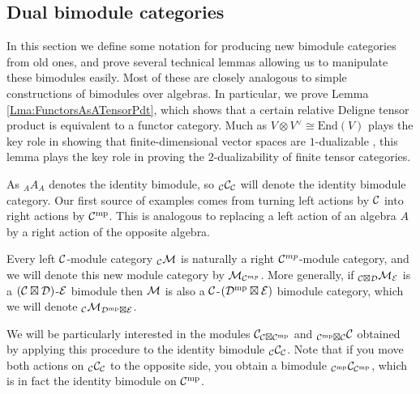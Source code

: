 \documentclass{amsart}
\begin{document}
\subsection{Dual bimodule categories} \label{sec:tc-bimodules} 

In this section we define some notation for producing new bimodule categories from old ones, and prove several technical lemmas allowing us to manipulate these bimodules easily.  Most of these are closely analogous to simple constructions of bimodules over algebras.  In particular, we prove Lemma \ref{Lma:FunctorsAsATensorPdt}, which shows that a certain relative Deligne tensor product is equivalent to a functor category.  Much as $V \otimes V^\vee \cong \mathrm{End}(V)$ plays the key role in showing that finite-dimensional vector spaces are $1$-dualizable \cite[Ex. 1.1.9]{lurie-ch}, this lemma plays the key role in proving the $2$-dualizability of finite tensor categories.

As ${}_A A_A$ denotes the identity bimodule, so ${}_\mathcal C \mathcal C_{\mathcal C}$ will denote the identity bimodule category.  Our first source of examples comes from turning left actions by $\mathcal C$ into right actions by $\mathcal C^{\mathrm{mp}}$.  This is analogous to replacing a left action of an algebra $A$ by a right action of the opposite algebra.

\begin{definition}
Every left $\mathcal C$-module category ${}_\mathcal C \mathcal M$ is naturally a right $\mathcal C^{mp}$-module category, and we will denote this new module category by $\mathcal M_{\mathcal C^{mp}}$.  More generally, if ${}_{\mathcal C \boxtimes \mathcal D} \mathcal M_{\mathcal E}$ is a $(\mathcal C \boxtimes \mathcal D)$-$\mathcal E$ bimodule then $\mathcal M$ is also a $\mathcal C$-$(\mathcal D^{\mathrm{mp}} \boxtimes \mathcal E)$ bimodule category, which we will denote ${}_{\mathcal C}\mathcal M_{\mathcal D^{\mathrm{mp}} \boxtimes \mathcal E}$.
\end{definition}

We will be particularly interested in the modules $\mathcal C_{\mathcal C \boxtimes \mathcal C^{\mathrm{mp}}}$ and ${}_{\mathcal C^{\mathrm{mp}} \boxtimes \mathcal C} \mathcal C$ obtained by applying this procedure to the identity bimodule ${}_\mathcal C \mathcal C_\mathcal C$.  Note that if you move both actions on ${}_\mathcal C \mathcal C_\mathcal C$ to the opposite side, you obtain a bimodule ${}_{\mathcal C^{\mathrm{mp}}}\mathcal C_{\mathcal C^{\mathrm{mp}}}$, which is in fact the identity bimodule on $\mathcal C^{\mathrm{mp}}$.
\end{document}
